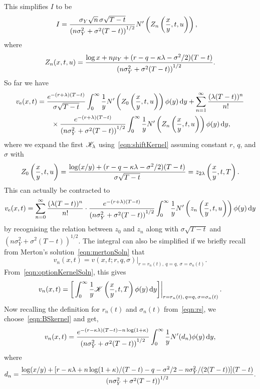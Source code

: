 {This simplifies $I$ to be
	\begin{align*}
		I &=  \frac{\sigma_Y\sqrt{n} \, \sigma\sqrt{T-t}}{\left( n\sigma_Y^2 +  \sigma^2(T-t) \right)^{1/2}}N'\left( Z_n\left( \frac{x}{y},t,u \right) \right),
	\end{align*}
where
	\begin{equation}
		\label{eqn:zn}
		Z_n(x,t,u) = \frac{\log x + n\mu_Y + (r - q - \kappa\lambda - \sigma^2/2)(T-t)}{\left( n\sigma_Y^2 + \sigma^2(T-t) \right)^{1/2}}.
	\end{equation}
So far we have
	\begin{align*}
		v_\text{e}(x,t) &= \frac{e^{-(r+\lambda)(T-t)}}{\sigma\sqrt{T-t}}\int_0^\infty \frac{1}{y}N'\left( Z_0\left( \frac{x}{y},t,u \right) \right) \phi(y) \, \mathrm d y  + \displaystyle\sum\limits_{n=1}^\infty \frac{(\lambda(T-t))^n}{n!}\\
		& \qquad \times \frac{e^{-(r+\lambda)(T-t)}}{\left( n\sigma_Y^2 + \sigma^2(T-t) \right)^{1/2}}\int_0^\infty \frac{1}{y}N'\left(Z_n\left( \frac{x}{y},t,u \right)\right) \phi(y) \, \mathrm d y,
	\end{align*}
where we expand the first $\mathscr K_\lambda$ using~\eqref{eqn:shiftKernel} assuming constant $r$, $q$, and $\sigma$ with
	$$
		Z_0\left(\frac{x}{y},t,u\right) = \frac{\log(x/y) + (r - q - \kappa\lambda - \sigma^2/2)(T-t)}{\sigma\sqrt{T-t}} = z_{2\lambda}\left(\frac{x}{y},t, T\right).
	$$
This can actually be contracted to
	$$
		v_\text{e}(x,t) = \displaystyle\sum\limits_{n=0}^\infty\frac{(\lambda(T-t))^n}{n!}\cdot\frac{e^{-(r+\lambda)(T-t)}}{\left( n\sigma_Y^2 + \sigma^2(T-t) \right)^{1/2}}\int_0^\infty \frac{1}{y}N'\left(z_n\left( \frac{x}{y},t,u \right)\right) \phi(y) \, \mathrm d y
	$$
by recognising the relation between $z_0$ and $z_n$ along with $\sigma\sqrt{T-t}$ and $(n\sigma_Y^2 + \sigma^2(T-t))^{1/2}$. The integral can also be simplified if we briefly recall from Merton's solution~\eqref{eqn:mertonSoln} that
	$$
		v_n(x,t) = v(x,t;r,q,\sigma)|_{r=r_n(t), \ q = q, \ \sigma = \sigma_n(t)}.
	$$
From~\eqref{eqn:optionKernelSoln}, this gives
	$$
		v_n(x,t) = \bigg[ \int_0^\infty \frac{1}{y} \mathscr K\left( \frac{x}{y}, t, T \right) \phi(y) \, \mathrm d y \bigg]\bigg|_{r=r_n(t), \, q = q, \, \sigma = \sigma_n(t)}\,.
	$$
Now recalling the definition for $r_n(t)$ and $\sigma_n(t)$ from~\eqref{eqn:rs}, we choose~\eqref{eqn:BSkernel} and get,
	$$
		v_n(x,t) =\frac{e^{-(r-\kappa\lambda)(T-t)-n\log(1+\kappa)}}{\left(n\sigma_Y^2 + \sigma^2(T-t)\right)^{1/2}}\int_0^\infty \frac{1}{y}N'(d_n) \phi(y) \, \mathrm d y,
	$$
where
	$$
		d_n = \frac{\log(x/y) + [r-\kappa\lambda + n\log(1+\kappa)/(T-t) - q - \sigma^2/2 - n\sigma_Y^2/(2(T-t))](T-t)}{\left(n\sigma_Y^2 + \sigma^2(T-t)\right)^{1/2}}.
	$$
}
